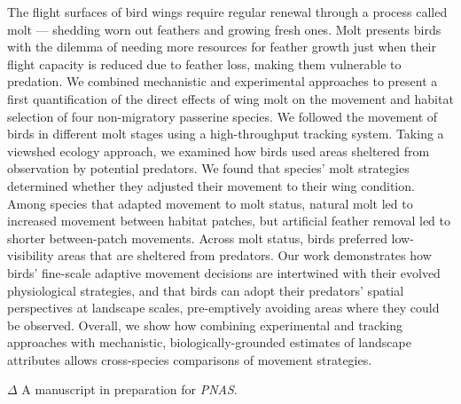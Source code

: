 \small{
    The flight surfaces of bird wings require regular renewal through a process called molt --- shedding worn out feathers and growing fresh ones.
    Molt presents birds with the dilemma of needing more resources for feather growth just when their flight capacity is reduced due to feather loss, making them vulnerable to predation.
    We combined mechanistic and experimental approaches to present a first quantification of the direct effects of wing molt on the movement and habitat selection of four non-migratory passerine species. 
    We followed the movement of birds in different molt stages using a high-throughput tracking system. 
    Taking a viewshed ecology approach, we examined how birds used areas sheltered from observation by potential predators.
    We found that species' molt strategies determined whether they adjusted their movement to their wing condition. 
    Among species that adapted movement to molt status, natural molt led to increased movement between habitat patches, but artificial feather removal led to shorter between-patch movements. 
    Across molt status, birds preferred low-visibility areas that are sheltered from predators.
    Our work demonstrates how birds’ fine-scale adaptive movement decisions are intertwined with their evolved physiological strategies, and that birds can adopt their predators’ spatial perspectives at landscape scales, pre-emptively avoiding areas where they could be observed.
    Overall, we show how combining experimental and tracking approaches with mechanistic, biologically-grounded estimates of landscape attributes allows cross-species comparisons of movement strategies.

    \bigskip

    {\noindent \large{$\Delta$}} \normalfont A manuscript in preparation for \textit{PNAS}.

}

\clearpage
